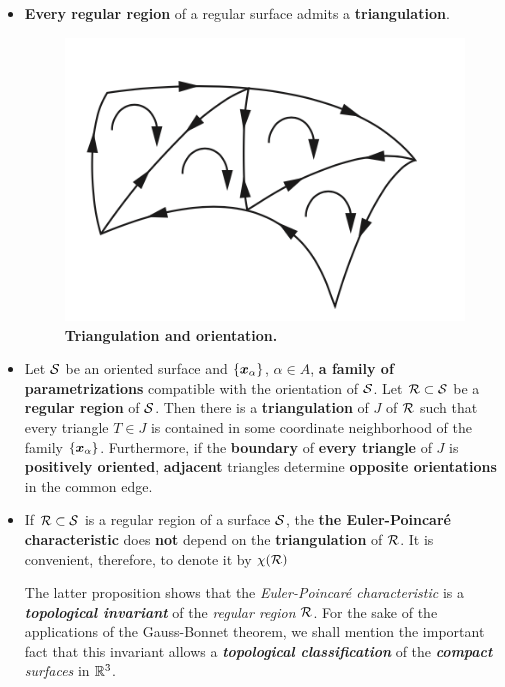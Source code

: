 \documentclass[11pt]{article}
\begin{document}
\begin{itemize}
\item \begin{proposition}
\textbf{Every regular region} of a regular surface admits a \textbf{triangulation}.
\end{proposition}

\begin{figure}[htb]
\centering
\begin{minipage}{1\linewidth}
 \centerline{\includegraphics[scale = 0.5]{triangulation.png}}
\end{minipage}
\caption{\scriptsize
\textbf{Triangulation and orientation. \citep{do1976differential}}}
\label{fig: triangulation}
\end{figure}


\item \begin{proposition}
Let ${\mathcal S}$ be an oriented surface and $\left\{\boldsymbol{x}_{\alpha}\right\}$, $\alpha \in A$, \textbf{a family of parametrizations} compatible with the orientation of ${\mathcal S}$. Let ${\mathcal R} \subset {\mathcal S}$ be a \textbf{regular region} of ${\mathcal S}$. Then there is a \textbf{triangulation} of $J$ of ${\mathcal R}$ such that every triangle $T \in J$ is contained in some coordinate neighborhood of the family $\left\{\boldsymbol{x}_{\alpha}\right\}$. Furthermore, if the \textbf{boundary} of \textbf{every triangle} of $J$ is \textbf{positively oriented}, \textbf{adjacent} triangles determine \textbf{opposite orientations} in the common edge.
\end{proposition}

\item \begin{proposition}
If ${\mathcal R} \subset {\mathcal S}$ is a regular region of a surface ${\mathcal S}$, the \textbf{the Euler-Poincar\'e characteristic} does \textbf{not} depend on the \textbf{triangulation} of ${\mathcal R}$. It is convenient, therefore, to denote it by $\chi({\mathcal R})$
\end{proposition}
The latter proposition shows that the \emph{Euler-Poincar\'e characteristic} is a \emph{\textbf{topological invariant}} of the \emph{regular region} ${\mathcal R}$. For the sake of the applications of the Gauss-Bonnet theorem, we shall mention the important fact that this invariant allows a \textbf{\emph{topological classification}} of the \emph{\textbf{compact} surfaces} in ${\mathbb R}^3$.


\end{itemize}
\end{document}
